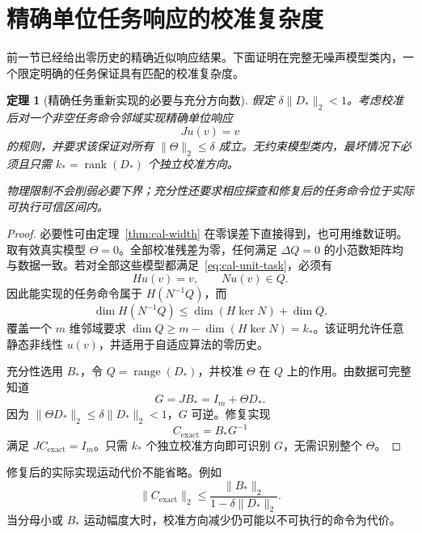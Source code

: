 \documentclass[11pt,a4paper]{article}
\numberwithin{equation}{section}
\newtheorem{theorem}{定理}[section]
\theoremstyle{definition}
\begin{document}
\section{精确单位任务响应的校准复杂度}
\label{sec:cal-exact-complexity}

前一节已经给出零历史的精确近似响应结果。下面证明在完整无噪声模型类内，一个限定明确的任务保证具有匹配的校准复杂度。

\begin{theorem}[精确任务重新实现的必要与充分方向数]
\label{thm:cal-exact-task}
假定 $\delta\|D_*\|_2<1$。考虑校准后对一个非空任务命令邻域实现精确单位响应
\begin{equation}
  Ju(v)=v
  \label{eq:cal-unit-task}
\end{equation}
的规则，并要求该保证对所有 $\|\Theta\|_2\le\delta$ 成立。无约束模型类内，最坏情况下必须且只需 $k_*=\operatorname{rank}(D_*)$ 个独立校准方向。

物理限制不会削弱必要下界；充分性还要求相应探查和修复后的任务命令位于实际可执行可信区间内。
\end{theorem}

\begin{proof}
必要性可由定理~\ref{thm:cal-width} 在零误差下直接得到，也可用维数证明。取有效真实模型 $\Theta=0$。全部校准残差为零，任何满足 $\Delta Q=0$ 的小范数矩阵均与数据一致。若对全部这些模型都满足~\eqref{eq:cal-unit-task}，必须有
\begin{equation}
  Hu(v)=v,\qquad Nu(v)\in Q .
\end{equation}
因此能实现的任务命令属于 $H(N^{-1}Q)$，而
\begin{equation}
  \dim H(N^{-1}Q)
  \le\dim(H\ker N)+\dim Q .
\end{equation}
覆盖一个 $m$ 维邻域要求 $\dim Q\ge m-\dim(H\ker N)=k_*$。该证明允许任意静态非线性 $u(v)$，并适用于自适应算法的零历史。

充分性选用 $B_*$，令 $Q=\operatorname{range}(D_*)$，并校准 $\Theta$ 在 $Q$ 上的作用。由数据可完整知道
\begin{equation}
  G=JB_*=I_m+\Theta D_* .
\end{equation}
因为 $\|\Theta D_*\|_2\le\delta\|D_*\|_2<1$，$G$ 可逆。修复实现
\begin{equation}
  C_{\mathrm{exact}}=B_*G^{-1}
  \label{eq:cal-exact-repair}
\end{equation}
满足 $JC_{\mathrm{exact}}=I_m$。只需 $k_*$ 个独立校准方向即可识别 $G$，无需识别整个 $\Theta$。
\end{proof}

修复后的实际实现运动代价不能省略。例如
\begin{equation}
  \|C_{\mathrm{exact}}\|_2
  \le
  \frac{\|B_*\|_2}{1-\delta\|D_*\|_2}.
  \label{eq:cal-exact-command-bound}
\end{equation}
当分母小或 $B_*$ 运动幅度大时，校准方向减少仍可能以不可执行的命令为代价。
\end{document}

